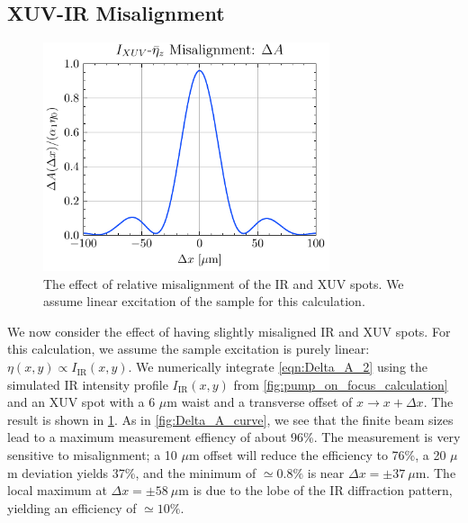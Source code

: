 \subsection{XUV-IR Misalignment}

\begin{figure}
	\centering
	\includegraphics[width=0.75\textwidth]{figures/chap4/XUV_eta_misalignment.pdf}
	\caption{The effect of relative misalignment of the IR and XUV spots. We assume linear excitation of the sample for this calculation.}
	\label{fig:XUV_eta_misalignment}
\end{figure}

We now consider the effect of having slightly misaligned IR and XUV spots. For this calculation, we assume the sample excitation is purely linear: $\eta(x,y) \propto I_{\textrm{IR}}(x,y)$. We numerically integrate \cref{eqn:Delta_A_2} using the simulated IR intensity profile $I_{\textrm{IR}}(x,y)$ from \cref{fig:pump_on_focus_calculation} and an XUV spot with a 6 $\mu$m waist and a transverse offset of $x \rightarrow x+\Delta x$. The result is shown in \cref{fig:XUV_eta_misalignment}. As in \cref{fig:Delta_A_curve}, we see that the finite beam sizes lead to a maximum measurement effiency of about 96\%. The measurement is very sensitive to misalignment; a 10 $\mu$m offset will reduce the efficiency to 76\%, a 20 $\mu$m deviation yields 37\%, and the minimum of $\simeq 0.8\%$ is near $\Delta x = \pm 37 \ \mu \textrm{m}$. The local maximum at $\Delta x = \pm 58 \ \mu \textrm{m}$ is due to the  lobe of the IR diffraction pattern, yielding an efficiency of $\simeq 10\%$.


